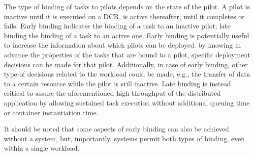 \documentclass{sig-alternate}
\begin{document}



The type of binding of tasks to pilots depends on the state of the pilot. A
pilot is inactive until it is executed on a DCR, is active thereafter, until it
completes or fails. Early binding indicates the binding of a task to an inactive
pilot; late binding the binding of a task to an active one. Early binding is
potentially useful to increase the information about which pilots can be
deployed: by knowing in advance the properties of the tasks that are bound to a
pilot, specific deployment decisions can be made for that pilot. Additionally,
in case of early binding, other type of decisions related to the workload could
be made, e.g., the transfer of data to a certain resource while the pilot is
still inactive. Late binding is instead critical to assure the aforementioned
high throughput of the distributed application by allowing sustained task
execution without additional queuing time or container instantiation time.

It should be noted that some aspects of early binding can also be achieved
without a \pilot system, but, importantly, \pilot systems permit both types of
binding, even within a single workload.


\end{document}
